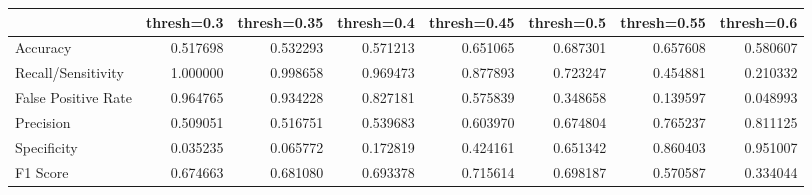 \begin{tabu}{lrrrrrrr}
\toprule
 & thresh=0.3 & thresh=0.35 & thresh=0.4 & thresh=0.45 & thresh=0.5 & thresh=0.55 & thresh=0.6 \\
\midrule
Accuracy & 0.517698 & 0.532293 & 0.571213 & 0.651065 & 0.687301 & 0.657608 & 0.580607 \\
Recall/Sensitivity & 1.000000 & 0.998658 & 0.969473 & 0.877893 & 0.723247 & 0.454881 & 0.210332 \\
False Positive Rate & 0.964765 & 0.934228 & 0.827181 & 0.575839 & 0.348658 & 0.139597 & 0.048993 \\
Precision & 0.509051 & 0.516751 & 0.539683 & 0.603970 & 0.674804 & 0.765237 & 0.811125 \\
Specificity & 0.035235 & 0.065772 & 0.172819 & 0.424161 & 0.651342 & 0.860403 & 0.951007 \\
F1 Score & 0.674663 & 0.681080 & 0.693378 & 0.715614 & 0.698187 & 0.570587 & 0.334044 \\
\bottomrule
\end{tabu}
